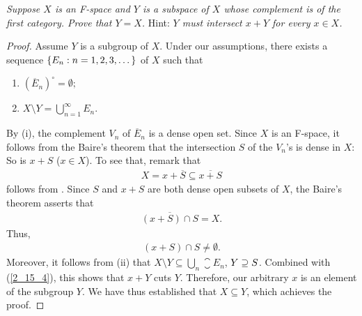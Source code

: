 \textit{%
Suppose $X$ is an F-space and $Y$ is a subspace of $X$ %
whose complement is of the first category. %
Prove that $Y=X$. }Hint: \textit{%
%
  $Y$ must intersect $x+Y$ for every $x\in X$. %
%
}
%
\begin{proof} Assume $Y$ is a subgroup of $X$. %
Under our assumptions, %
there exists a sequence $\{E_n: n=1, 2, 3, \dots\}$ of $X$ such that %
%
  \renewcommand{\labelenumi}{(\roman{enumi})} 
  \begin{enumerate}
    \item ${(\overline{E}_n)}^\circ=\emptyset ;$
    \item $X\setminus Y = \displaystyle{\bigcup_{n=1}^\infty  E_n}$.
  \end{enumerate}
%
By (i), the complement $V_n$ of $\overline{E}_n$ is a dense open set. %
Since $X$ is an F-space, it follows from the Baire's theorem that %
%
  the intersection $S$ of the $V_n$'s is dense in $X$:  %
%
So is $x+S$ ($x\in X$). To see that, remark that %
%
  \begin{align}\label{2_15_2}
    X = x + \overline{S} \subseteq \overline{x + S}
  \end{align} 
%
follows from . %
Since $S$ and $x+S$ are both dense open subsets of $X$, %
the Baire's theorem asserts that %
%
  \begin{align}
    \overline{(x+S)\cap S} = X.
  \end{align} 
%
Thus, 
%
  \begin{align}\label{2_15_4}
    (x+S)\cap S\neq\emptyset.
  \end{align}
%
Moreover, it follows from (ii) that %
%
  $X\setminus Y \subseteq \bigcup_n \closure{E}_n$, \ie 
  $Y \supseteq S$. %
Combined with (\ref{2_15_4}), this shows that $x+Y$ cuts $Y$. 
Therefore, our arbitrary $x$ is an element of the subgroup $Y$. %
We have thus established that $X \subseteq Y$, which achieves the proof.
\end{proof}
\renewcommand{\labelenumi}{(\alph{enumi})} 
%
